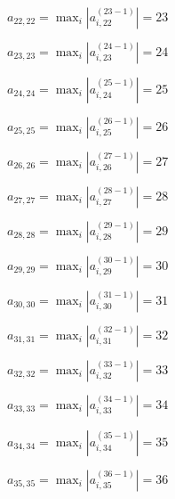 \documentclass[a4paper,12pt]{article}
\begin{document}
$a _{ 22, 22 } =  \max _i |a _{ i, 22 } ^{ (23 - 1) } | = 23$

$a _{ 23, 23 } =  \max _i |a _{ i, 23 } ^{ (24 - 1) } | = 24$

$a _{ 24, 24 } =  \max _i |a _{ i, 24 } ^{ (25 - 1) } | = 25$

$a _{ 25, 25 } =  \max _i |a _{ i, 25 } ^{ (26 - 1) } | = 26$

$a _{ 26, 26 } =  \max _i |a _{ i, 26 } ^{ (27 - 1) } | = 27$

$a _{ 27, 27 } =  \max _i |a _{ i, 27 } ^{ (28 - 1) } | = 28$

$a _{ 28, 28 } =  \max _i |a _{ i, 28 } ^{ (29 - 1) } | = 29$

$a _{ 29, 29 } =  \max _i |a _{ i, 29 } ^{ (30 - 1) } | = 30$

$a _{ 30, 30 } =  \max _i |a _{ i, 30 } ^{ (31 - 1) } | = 31$

$a _{ 31, 31 } =  \max _i |a _{ i, 31 } ^{ (32 - 1) } | = 32$

$a _{ 32, 32 } =  \max _i |a _{ i, 32 } ^{ (33 - 1) } | = 33$

$a _{ 33, 33 } =  \max _i |a _{ i, 33 } ^{ (34 - 1) } | = 34$

$a _{ 34, 34 } =  \max _i |a _{ i, 34 } ^{ (35 - 1) } | = 35$

$a _{ 35, 35 } =  \max _i |a _{ i, 35 } ^{ (36 - 1) } | = 36$
\end{document}
